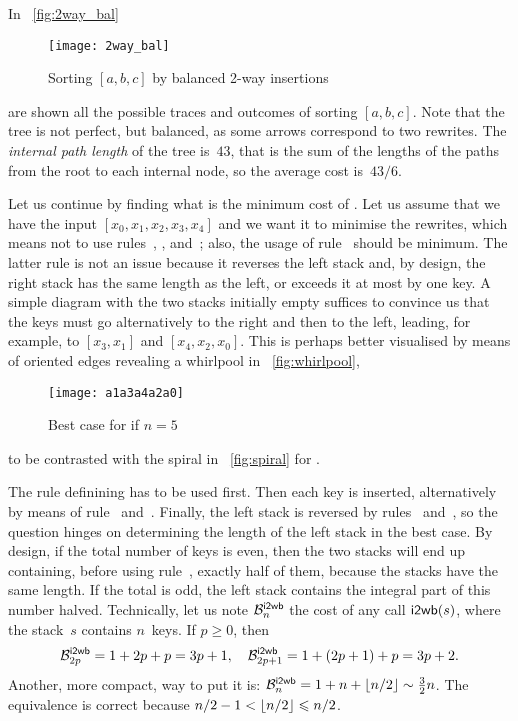 In \fig~\vref{fig:2way_bal}
\begin{figure}
\centering
\texttt{[image: 2way\_bal]}
\caption{Sorting \([a,b,c]\) by balanced 2-way insertions
\label{fig:2way_bal}}
\end{figure}
are shown all the possible traces and
outcomes of sorting \([a,b,c]\). Note that the tree is not
perfect, but balanced, as some arrows
correspond to two rewrites. The \emph{internal path
  length}\label{insertion__internal_path_length}
 of the tree is~\(43\), that
is the sum of the lengths of the paths from the root to each internal
node, so the average cost is~\(43/6\).


Let us continue by finding what is the minimum cost of
. Let us assume that we have the input \([x_0, x_1, x_2,
x_3, x_4]\) and we want it to minimise the rewrites, which means not
to use rules~\clause{\sigma}, \clause{\tau}, \clause{\phi}
and~\clause{\chi}; also, the usage of rule~\clause{\rho} should be
minimum. The latter rule is not an issue because it reverses the left
stack and, by design, the right stack has the same length as the left,
or exceeds it at most by one key. A simple diagram with the two stacks
initially empty suffices to convince us that the keys must go
alternatively to the right and then to the left, leading, for example,
to \([x_3 , x_1]\) and \([x_4, x_2, x_0]\). This is perhaps better
visualised by means of oriented edges revealing a whirlpool in
\fig~\vref{fig:whirlpool},
\begin{figure}[b]
\centering
\texttt{[image: a1a3a4a2a0]}
\caption{Best case for  if \(n=5\)
\label{fig:whirlpool}}
\end{figure}
to be contrasted with the spiral in \fig~\vref{fig:spiral} for
.

The rule definining  has to be used first. Then each key is
inserted, alternatively by means of rule~\clause{\upsilon}
and~\clause{\psi}. Finally, the left stack is reversed by
rules~\clause{\pi} and~\clause{\rho}, so the question hinges on
determining the length of the left stack in the best case. By design,
if the total number of keys is even, then the two stacks will end up
containing, before using rule~\clause{\rho}, exactly half of them,
because the stacks have the same length. If the total is odd, the left
stack contains the integral part of this number halved. Technically,
let us note \(\B{\fun{i2wb}}{n}\) the cost of any call
\(\fun{i2wb}(s)\), where the stack~\(s\) contains \(n\)~keys. If \(p
\geqslant 0\), then
\begin{equation*}
\B{\fun{i2wb}}{2p}   = 1 +     2p + p = 3p + 1,\quad
\B{\fun{i2wb}}{2p+1} = 1 + (2p+1) + p = 3p + 2.
\end{equation*}
Another, more compact, way to put it is: \(\B{\fun{i2wb}}{n} = 1 + n
+ \floor{n/2} \sim \tfrac{3}{2}{n}\). The equivalence is correct
because \(n/2-1 < \floor{n/2} \leqslant n/2\).

